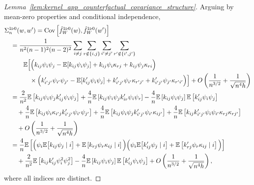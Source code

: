 \begin{proof}[Lemma~\ref{lem:kernel_app_counterfactual_covariance_structure}]

  Arguing by mean-zero properties and conditional independence,
  \begin{align*}
    &\Sigma_n^{1 \triangleright 0}(w,w')
    = \operatorname{Cov}\left[
      \hat f_W^{1 \triangleright 0}(w),
      \hat f_W^{1 \triangleright 0}(w')
    \right] \\
    &\quad=
    \frac{1}{n^2(n-1)^2(n-2)^2}
    \sum_{i \neq j}
    \sum_{r \notin \{i,j\}}
    \sum_{i' \neq j'}
    \sum_{r' \notin \{i',j'\}} \\
    &\quad\qquad\mathbb{E}\Big[
      \Big(
        k_{i j} \psi_i \psi_j
        - \mathbb{E}[k_{i j} \psi_i \psi_j]
        + k_{i j}\psi_i \kappa_{r j}
        + k_{i j}\psi_j \kappa_{r i}
      \Big) \\
      &\qquad\qquad\times
      \Big(
        k_{i' j'}' \psi_{i'} \psi_{j'}
        - \mathbb{E}[k_{i j}' \psi_i \psi_j]
        + k_{i' j'}'\psi_{i'} \kappa_{r' j'}
        + k_{i' j'}'\psi_{j'} \kappa_{r' i'}
      \Big)
    \Big]
    + O\left( \frac{1}{n^{3/2}} + \frac{1}{\sqrt{n^4h}} \right) \\
    &\quad=
    \frac{2}{n^2}
    \mathbb{E}\left[
      k_{i j} \psi_i \psi_j
      k_{i j}' \psi_i \psi_j
    \right]
    + \frac{4}{n}
    \mathbb{E}\left[
      k_{i j} \psi_i \psi_j
      k_{i r}' \psi_i \psi_r
    \right]
    - \frac{4}{n}
    \mathbb{E}\left[
      k_{i j} \psi_i \psi_j
    \right]
    \mathbb{E}\left[
      k_{i j}' \psi_i \psi_j
    \right] \\
    &\qquad+
    \frac{4}{n}
    \mathbb{E}\left[
      k_{i j}\psi_i \kappa_{i' j}
      k_{i' j'}' \psi_{i'} \psi_{j'}
    \right]
    + \frac{4}{n}
    \mathbb{E}\left[
      k_{i j} \psi_{i} \psi_{j}
      k_{i' j'}'\psi_{i'} \kappa_{i j'}
    \right]
    + \frac{4}{n}
    \mathbb{E}\left[
      k_{i j} k'_{i' j'}
      \psi_i \psi_{i'}
      \kappa_{r j} \kappa_{r j'}
    \right] \\
    &\qquad+
    O\left( \frac{1}{n^{3/2}} + \frac{1}{\sqrt{n^4h}} \right) \\
    &\quad=
    \frac{4}{n}
    \mathbb{E}\left[
      \Big(
        \psi_i
        \mathbb{E}\big[
          k_{i j} \psi_j
          \mid i
        \big]
        + \mathbb{E}\left[
          k_{r j} \psi_r \kappa_{i j}
          \mid i
        \right]
      \Big)
      \Big(
        \psi_i
        \mathbb{E}\big[
          k_{i j}' \psi_j
          \mid i
        \big]
        + \mathbb{E}\left[
          k_{r j}' \psi_r \kappa_{i j}
          \mid i
        \right]
      \Big)
    \right] \\
    &\qquad+
    \frac{2}{n^2}
    \mathbb{E}\left[
      k_{i j} k_{i j}'
      \psi_i^2 \psi_j^2
    \right]
    - \frac{4}{n}
    \mathbb{E}\left[
      k_{i j} \psi_i \psi_j
    \right]
    \mathbb{E}\left[
      k_{i j}' \psi_i \psi_j
    \right]
    + O\left( \frac{1}{n^{3/2}} + \frac{1}{\sqrt{n^4h}} \right),
  \end{align*}
  where all indices are distinct.
\end{proof}

